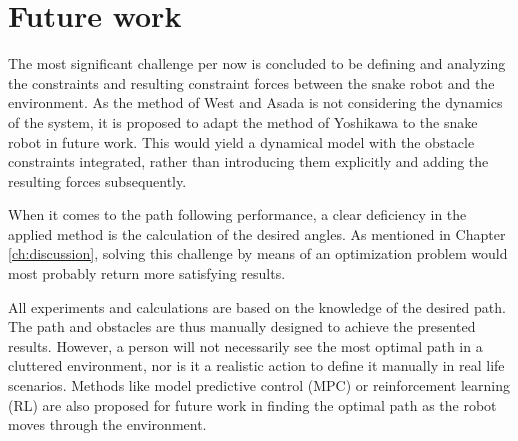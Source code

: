 \section{Future work}

The most significant challenge per now is concluded to be defining and analyzing the constraints and resulting constraint forces between the snake robot and the environment. As the method of West and Asada \cite{west1985method} is not considering the dynamics of the system, it is proposed to adapt the method of Yoshikawa \cite{yoshikawa1987dynamic} to the snake robot in future work. This would yield a dynamical model with the obstacle constraints integrated, rather than introducing them explicitly and adding the resulting forces subsequently.

When it comes to the path following performance, a clear deficiency in the applied method is the calculation of the desired angles. As mentioned in Chapter \ref{ch:discussion}, solving this challenge by means of an optimization problem would most probably return more satisfying results.

All experiments and calculations are based on the knowledge of the desired path. The path and obstacles are thus manually designed to achieve the presented results. However, a person will not necessarily see the most optimal path in a cluttered environment, nor is it a realistic action to define it manually in real life scenarios. 
Methods like model predictive control (MPC) or reinforcement learning (RL) are also proposed for future work in finding the optimal path as the robot moves through the environment.

